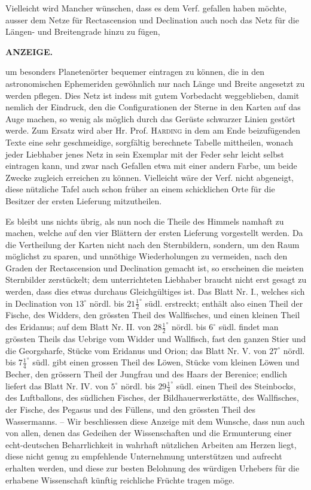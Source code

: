 Vielleicht wird Mancher wünschen, dass es dem Verf. gefallen haben möchte, ausser dem Netze für Rectascension und Declination auch noch das Netz für die Längen- und Breitengrade hinzu zu fügen,\par
\clearpage
\thispagestyle{empty}
\noindent{}%
%
\parbox[t]{\dimexpr\linewidth-24mm\relax}{\centering\footnotesize\bfseries ANZEIGE.\par}%
\makebox[12mm][r]{}\par\nobreak\medskip
\noindent um besonders Planetenörter bequemer eintragen zu können, die in den astronomischen Ephemeriden gewöhnlich nur nach Länge und Breite angesetzt zu werden pflegen. Dies Netz ist indess mit gutem Vorbedacht weggeblieben, damit nemlich der Eindruck, den die Configurationen der Sterne in den Karten auf das Auge machen, so wenig als möglich durch das Gerüste schwarzer Linien gestört werde. Zum Ersatz wird aber Hr. Prof. \textsc{Harding} in dem am Ende beizufügenden Texte eine sehr geschmeidige, sorgfältig berechnete Tabelle mittheilen, wonach jeder Liebhaber jenes Netz in sein Exemplar mit der Feder sehr leicht selbst eintragen kann, und zwar nach Gefallen etwa mit einer andern Farbe, um beide Zwecke zugleich erreichen zu können. Vielleicht wäre der Verf. nicht abgeneigt, diese nützliche Tafel auch schon früher an einem schicklichen Orte für die Besitzer der ersten Lieferung mitzutheilen.

Es bleibt uns nichts übrig, als nun noch die Theile des Himmels namhaft zu machen, welche auf den vier Blättern der ersten Lieferung vorgestellt werden. Da die Vertheilung der Karten nicht nach den Sternbildern, sondern, um den Raum möglichst zu sparen, und unnöthige Wiederholungen zu vermeiden, nach den Graden der Rectascension und Declination gemacht ist, so erscheinen die meisten Sternbilder zerstückelt; dem unterrichteten Liebhaber braucht nicht erst gesagt zu werden, dass dies etwas durchaus Gleichgültiges ist. Das Blatt Nr. I., welches sich in Declination von $13^\circ$ nördl. bis $21\frac{1}{2}^\circ$ südl. erstreckt; enthält also einen Theil der Fische, des Widders, den grössten Theil des Wallfisches, und einen kleinen Theil des Eridanus; auf dem Blatt Nr. II. von $28\frac{1}{2}^\circ$ nördl. bis $6^\circ$ südl. findet man grössten Theils das Uebrige vom Widder und Wallfisch, fast den ganzen Stier und die Georgsharfe, Stücke vom Eridanus und Orion; das Blatt Nr. V. von $27^\circ$ nördl. bis $7\frac{1}{4}^\circ$ südl. gibt einen grossen Theil des Löwen, Stücke vom kleinen Löwen und Becher, den grössern Theil der Jungfrau und des Haars der Berenice; endlich liefert das Blatt Nr. IV. von $5^\circ$ nördl. bis $29\frac{1}{4}^\circ$ südl. einen Theil des Steinbocks, des Luftballons, des südlichen Fisches, der Bildhauerwerkstätte, des Wallfisches, der Fische, des Pegasus und des Füllens, und den grössten Theil des Wassermanns. -- Wir beschliessen diese Anzeige mit dem Wunsche, dass nun auch von allen, denen das Gedeihen der Wissenschaften und die Ermunterung einer echt-deutschen Beharrlichkeit in wahrhaft nützlichen Arbeiten am Herzen liegt, diese nicht genug zu empfehlende Unternehmung unterstützen und aufrecht erhalten werden, und diese zur besten Belohnung des würdigen Urhebers für die erhabene Wissenschaft künftig reichliche Früchte tragen möge.
